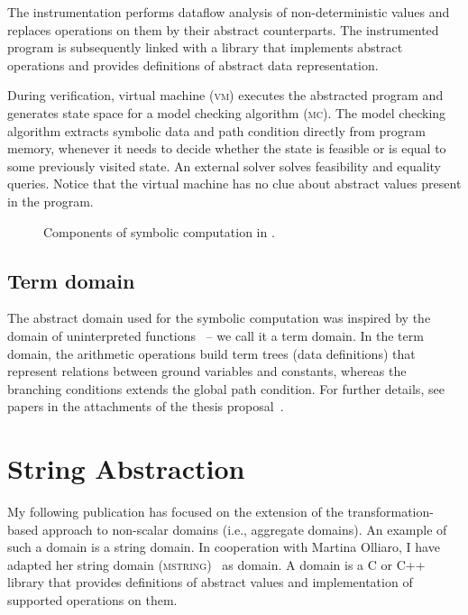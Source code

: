 The instrumentation performs dataflow analysis of non-de\-ter\-ministic values and
replaces operations on them by their abstract counterparts. The instrumented
program is subsequently linked with a library that implements abstract
operations and provides definitions of abstract data representation.

During verification, virtual machine (\textsc{vm}) executes the abs\-trac\-ted
program and generates state space for a model checking algorithm (\textsc{mc}).
The model checking algorithm extracts symbolic data and path condition directly
from program memory, whenever it needs to decide whether the state is feasible
or is equal to some previously visited state. An external \smt solver solves
feasibility and equality queries. Notice that the virtual machine has no clue
about abstract values present in the program.

\begin{figure}
    \centering
    
    \caption{Components of symbolic computation in \divine.}
    \label{fig:design}
\end{figure}

\subsection{Term domain}

The abstract domain used for the symbolic computation was inspired by the
domain of uninterpreted functions~\cite{Gange2016} -- we call it a term domain.
In the term domain, the arithmetic operations build term trees (data
definitions) that represent relations between ground variables and constants,
whereas the branching conditions extends the global path condition.  For
further details, see papers in the attachments of the thesis
proposal~\cite{Lauko2018SymComp, Lauko2019Sym}.

\section{String Abstraction}
\label{sec:string}

My following publication has focused on the extension of the
transformation-based approach to non-scalar domains (i.e., aggregate domains).
An example of such a domain is a string domain. In cooperation with Martina
Olliaro, I have adapted her string domain (\textsc{mstring})~\cite{Olliaro2018}
as \lart domain. A \lart domain is a C or C++ library that provides
definitions of abstract values and implementation of supported operations on
them.

